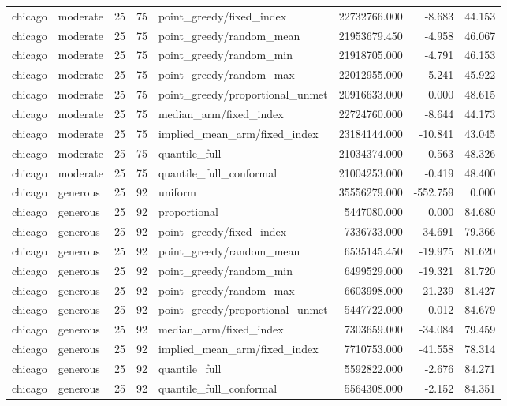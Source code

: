 \begin{tabular}{llrrlrrr}
chicago & moderate & 25 & 75 & point\_greedy/fixed\_index & 22732766.000 & -8.683 & 44.153 \\
chicago & moderate & 25 & 75 & point\_greedy/random\_mean & 21953679.450 & -4.958 & 46.067 \\
chicago & moderate & 25 & 75 & point\_greedy/random\_min & 21918705.000 & -4.791 & 46.153 \\
chicago & moderate & 25 & 75 & point\_greedy/random\_max & 22012955.000 & -5.241 & 45.922 \\
chicago & moderate & 25 & 75 & point\_greedy/proportional\_unmet & 20916633.000 & 0.000 & 48.615 \\
chicago & moderate & 25 & 75 & median\_arm/fixed\_index & 22724760.000 & -8.644 & 44.173 \\
chicago & moderate & 25 & 75 & implied\_mean\_arm/fixed\_index & 23184144.000 & -10.841 & 43.045 \\
chicago & moderate & 25 & 75 & quantile\_full & 21034374.000 & -0.563 & 48.326 \\
chicago & moderate & 25 & 75 & quantile\_full\_conformal & 21004253.000 & -0.419 & 48.400 \\
chicago & generous & 25 & 92 & uniform & 35556279.000 & -552.759 & 0.000 \\
chicago & generous & 25 & 92 & proportional & 5447080.000 & 0.000 & 84.680 \\
chicago & generous & 25 & 92 & point\_greedy/fixed\_index & 7336733.000 & -34.691 & 79.366 \\
chicago & generous & 25 & 92 & point\_greedy/random\_mean & 6535145.450 & -19.975 & 81.620 \\
chicago & generous & 25 & 92 & point\_greedy/random\_min & 6499529.000 & -19.321 & 81.720 \\
chicago & generous & 25 & 92 & point\_greedy/random\_max & 6603998.000 & -21.239 & 81.427 \\
chicago & generous & 25 & 92 & point\_greedy/proportional\_unmet & 5447722.000 & -0.012 & 84.679 \\
chicago & generous & 25 & 92 & median\_arm/fixed\_index & 7303659.000 & -34.084 & 79.459 \\
chicago & generous & 25 & 92 & implied\_mean\_arm/fixed\_index & 7710753.000 & -41.558 & 78.314 \\
chicago & generous & 25 & 92 & quantile\_full & 5592822.000 & -2.676 & 84.271 \\
chicago & generous & 25 & 92 & quantile\_full\_conformal & 5564308.000 & -2.152 & 84.351 \\

\end{tabular}
